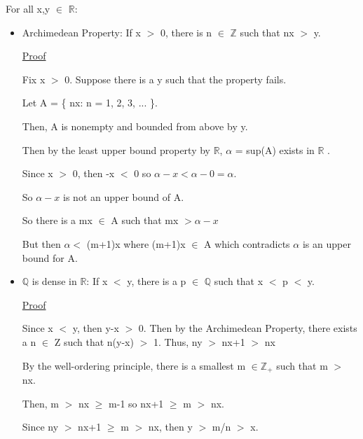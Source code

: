 	For all x,y $\in$ $ \mathbb{R} $:
	\begin{itemize}[leftmargin=1cm]
		\item {\color{lblue} Archimedean Property}:
			If x $>$ 0, there is n $\in$ $ \mathbb{Z} $ such that nx $>$ y.
	
			{ \color{magenta} \underline{Proof} }

				Fix x $>$ 0. Suppose there is a y such that the property fails.

				Let A = \{ nx: n = 1, 2, 3, ... \}.

				Then, A is nonempty and bounded from above by y.

				Then by the least upper bound property by $ \mathbb{R} $,
				$\alpha$ = sup(A) exists in $ \mathbb{R} $ .

				Since x $>$ 0, then -x $<$ 0 so $\alpha - x < \alpha-0 = \alpha$.

				So $\alpha-x$ is not an upper bound of A.

				So there is a mx $\in$ A such that mx $> \alpha-x$

				But then $\alpha <$ (m+1)x where (m+1)x $\in$ A which
				contradicts $\alpha$ is an upper bound for A.

		\item {\color{lblue} $ \mathbb{Q} $  is dense in $ \mathbb{R} $}:
			If x $<$ y, there is a p $\in$ $ \mathbb{Q} $ such that x $<$ p $<$ y.

			{ \color{magenta} \underline{Proof} }

				Since x $<$ y, then y-x $>$ 0. Then by the Archimedean Property,
				there exists a n $\in$ Z such that n(y-x) $>$ 1. Thus, ny $>$ nx+1 $>$ nx

				By the well-ordering principle, there is a smallest m $\in \mathbb{Z_+} $
				such that m $>$ nx.

				Then, m $>$ nx $\geq$ m-1 so nx+1 $\geq$ m $>$ nx.

				Since ny $>$ nx+1 $\geq$ m $>$ nx, then y $>$ m/n $>$ x.
\end{itemize}

